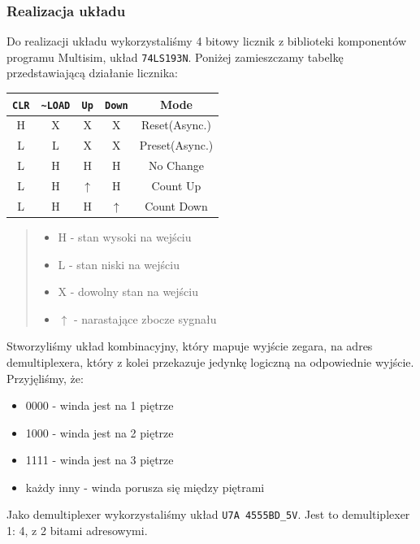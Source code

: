 \documentclass[a4paper]{article}
\begin{document}
\subsubsection{Realizacja układu}
Do realizacji układu wykorzystaliśmy 4 bitowy licznik z biblioteki komponentów programu Multisim,
układ \verb|74LS193N|. Poniżej zamieszczamy tabelkę przedstawiającą działanie licznika:
\begin{center}
    \begin{tabular}{|c|c|c|c||c|}
        \hline \verb|CLR| & \verb|~LOAD| & \verb|Up| & \verb|Down| & Mode \\
        \hline H & X & X & X & Reset(Async.) \\
        \hline L & L & X & X & Preset(Async.) \\
        \hline L & H & H & H & No Change \\
        \hline L & H & $\uparrow$ & H & Count Up \\
        \hline L & H & H & $\uparrow$ & Count Down \\
        \hline
    \end{tabular}
\end{center}

\begin{abstract}
    \noindent \begin{itemize}
        \item H - stan wysoki na wejściu
        \item L - stan niski na wejściu
        \item X - dowolny stan na wejściu
        \item $\uparrow$ - narastające zbocze sygnału
    \end{itemize}
\end{abstract}
Stworzyliśmy układ kombinacyjny, który mapuje wyjście zegara, na adres demultiplexera, który 
z kolei przekazuje jedynkę logiczną na odpowiednie wyjście. 
Przyjęliśmy, że:
\begin{itemize}
    \item 0000 - winda jest na 1 piętrze
    \item 1000 - winda jest na 2 piętrze
    \item 1111 - winda jest na 3 piętrze
    \item każdy inny - winda porusza się między piętrami
\end{itemize}
Jako demultiplexer wykorzystaliśmy układ \verb|U7A 4555BD_5V|. Jest to demultiplexer 1: 4, z 2 
bitami adresowymi.
\end{document}
